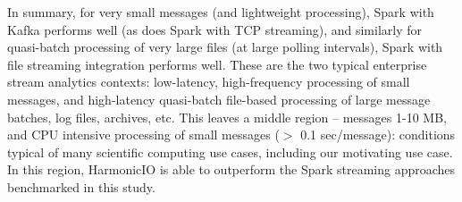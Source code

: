 \documentclass[conference]{IEEEtran}
\begin{document}
In summary, for very small messages (and lightweight processing), Spark with Kafka performs well (as does Spark with TCP streaming), and similarly for quasi-batch processing of very large files (at large polling intervals), Spark with file streaming integration performs well. These are the two typical enterprise stream analytics contexts: low-latency, high-frequency processing of small messages, and high-latency quasi-batch file-based processing of large message batches, log files, archives, etc.
This leaves a middle region -- messages 1-10 MB, and CPU intensive processing of small messages ($>$ 0.1 sec/message): conditions typical of many scientific computing use cases, including our motivating use case. In this region, HarmonicIO is able to outperform the Spark streaming approaches benchmarked in this study. 


\end{document}
